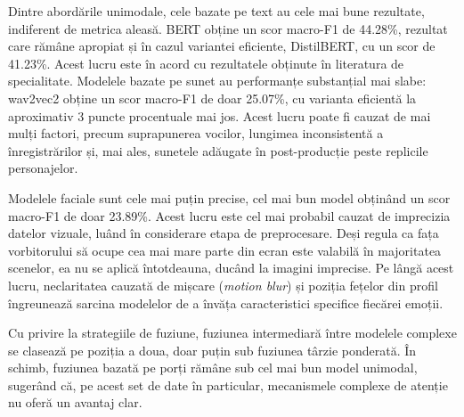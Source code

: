 \documentclass[12pt, a4paper]{article}
\begin{document}
Dintre abordările unimodale, cele bazate pe text au cele mai bune rezultate, indiferent de metrica aleasă. BERT obține un scor macro-F1 de 44.28\%, rezultat care rămâne apropiat și în cazul variantei eficiente, DistilBERT, cu un scor de 41.23\%. Acest lucru este în acord cu rezultatele obținute în literatura de specialitate. Modelele bazate pe sunet au performanțe substanțial mai slabe: wav2vec2 obține un scor macro-F1 de doar 25.07\%, cu varianta eficientă la aproximativ 3 puncte procentuale mai jos. Acest lucru poate fi cauzat de mai mulți factori, precum suprapunerea vocilor, lungimea inconsistentă a înregistrărilor și, mai ales, sunetele adăugate în post-producție peste replicile personajelor.

Modelele faciale sunt cele mai puțin precise, cel mai bun model obținând un scor macro-F1 de doar 23.89\%. Acest lucru este cel mai probabil cauzat de imprecizia datelor vizuale, luând în considerare etapa de preprocesare. Deși regula ca fața vorbitorului să ocupe cea mai mare parte din ecran este valabilă în majoritatea scenelor, ea nu se aplică întotdeauna, ducând la imagini imprecise. Pe lângă acest lucru, neclaritatea cauzată de mișcare (\textit{motion blur}) și poziția fețelor din profil îngreunează sarcina modelelor de a învăța caracteristici specifice fiecărei emoții.

Cu privire la strategiile de fuziune, fuziunea intermediară între modelele complexe se clasează pe poziția a doua, doar puțin sub fuziunea târzie ponderată. În schimb, fuziunea bazată pe porți rămâne sub cel mai bun model unimodal, sugerând că, pe acest set de date în particular, mecanismele complexe de atenție nu oferă un avantaj clar.
\end{document}
